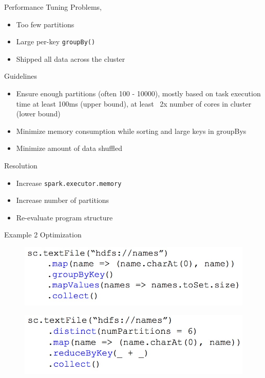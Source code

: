 \begin{frame}[plain]{Performance Tuning}
Problems,
\begin{itemize}
  \item Too few partitions
  \item Large per-key \texttt{groupBy()}
  \item Shipped all data across the cluster 
\end{itemize}

Guidelines
\begin{itemize}
  \item Ensure enough partitions (often 100 - 10000), mostly based on task
  execution time at least 100ms (upper bound), at least ~2x number of cores in
  cluster (lower bound)
  \item Minimize memory consumption while sorting and large keys in groupBys
  \item Minimize amount of data shuffled  
\end{itemize}

Resolution
\begin{itemize}
  \item Increase \texttt{spark.executor.memory}
  \item Increase number of partitions
  \item Re-evaluate program structure   
\end{itemize}
\end{frame}

\begin{frame}[plain]{Example 2 Optimization}
\begin{figure}
\centering
\includegraphics[width=0.9\linewidth]{figures/example2.jpg}
\end{figure}

\begin{figure}
\centering
\includegraphics[width=0.9\linewidth]{figures/example2-optimized.jpg}
\end{figure}
\end{frame}

